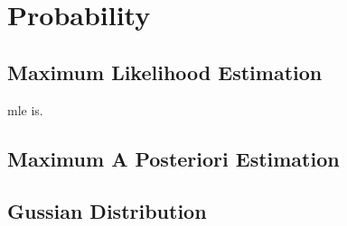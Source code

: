 \chapter{Probability}\label{chp:machine_learning}
\minitoc

\section{Maximum Likelihood Estimation}


\gls{mle} is.

\section{Maximum A Posteriori Estimation}

\section{Gussian Distribution}



